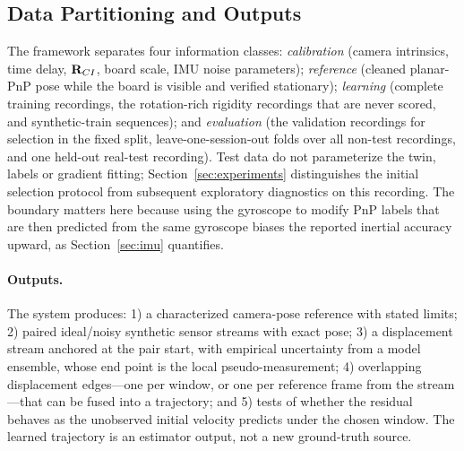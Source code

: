 \subsection{Data Partitioning and Outputs}
The framework separates four information classes: \emph{calibration} (camera
intrinsics, time delay, ${\bf R}_{CI}$, board scale, IMU noise parameters);
\emph{reference} (cleaned planar-PnP pose while the board is visible and
verified stationary); \emph{learning} (complete training recordings, the
rotation-rich rigidity recordings that are never scored, and synthetic-train
sequences); and \emph{evaluation} (the validation recordings for selection in
the fixed split, leave-one-session-out folds over all non-test recordings, and
one held-out real-test recording). Test data do not parameterize the twin,
labels or gradient fitting; Section~\ref{sec:experiments} distinguishes the
initial selection protocol from subsequent exploratory diagnostics on this
recording. The boundary matters here because using the gyroscope to modify
PnP labels that are then predicted from the same gyroscope biases the reported
inertial accuracy upward, as Section~\ref{sec:imu} quantifies.

\paragraph{Outputs.}
The system produces: 1) a characterized camera-pose reference with stated
limits; 2) paired ideal/noisy synthetic sensor streams with exact pose;
3) a displacement stream anchored at the pair start, with empirical
uncertainty from a model ensemble, whose end point is the local
pseudo-measurement; 4) overlapping displacement edges---one per window, or
one per reference frame from the stream---that can be fused into a
trajectory; and 5) tests of whether the residual behaves as the unobserved
initial velocity predicts under the chosen window. The learned trajectory is
an estimator output, not a new ground-truth source.
